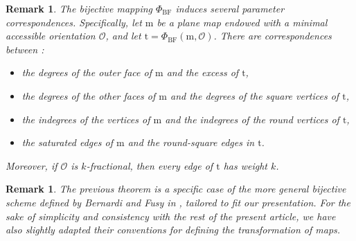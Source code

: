 \documentclass[11pt,reqno,tbtags]{amsart}
\renewcommand{\rm}{\mathrm{m}}
\newcommand{\rt}{\mathrm{t}}
\newtheorem{rema}[theo]{Remark}
\numberwithin{equation}{section}
\numberwithin{theo}{section}
\theoremstyle{definition}
\newcommand{\cO}{\mathcal{O}}
\begin{document}
\begin{rema}
The bijective mapping $\Phi_{\mathrm{BF}}$ induces several parameter correspondences. Specifically, let  $\rm$ be a plane map endowed with a minimal accessible orientation $\cO$, and let $\rt=\Phi_{\mathrm{BF}}(\rm,\cO)$. There are  correspondences between : 
\begin{itemize}
	\item the degrees of the outer face of $\rm$ and the excess of $\rt$,
	\item the degrees of the other faces of $\rm$ and the degrees of the square vertices of $\rt$,
	\item the indegrees of the vertices of $\rm$ and the indegrees of the round vertices of $\rt$,
	\item the saturated edges of $\rm$ and the round-square edges in $\rt$.
\end{itemize}
Moreover, if $\cO$ is $k$-fractional, then every edge of $\rt$ has weight $k$.
\end{rema}

\begin{rema}
The previous theorem is a specific case of the more general bijective scheme defined by Bernardi and Fusy in \cite{BernardiFusy_TrigQuadPent}, tailored to fit our presentation. For the sake of simplicity and consistency with the rest of the present article, we have also slightly adapted their conventions for defining the transformation of maps.
\end{rema}
\end{document}

